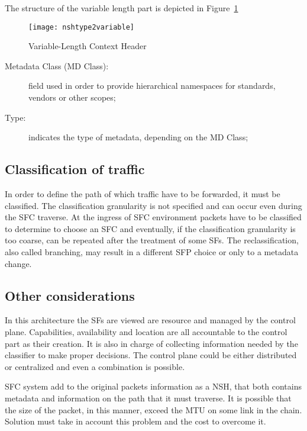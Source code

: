The structure of the variable length part is depicted in
Figure~\ref{chap:background:img:nshtype2variable}

\begin{figure}[H]
  \centering
  \texttt{[image: nshtype2variable]}
  \caption{Variable-Length Context Header~\cite{rfc8300}}
  \label{chap:background:img:nshtype2variable}
\end{figure}

\begin{description}
  \item[Metadata Class (MD Class):] field used in order to provide hierarchical
  namespaces for standards, vendors or other scopes;
  \item[Type:] indicates the type of metadata, depending on the MD Class;
\end{description}


\subsection{Classification of traffic}
In order to define the path of which traffic have to be forwarded, it must be
classified. The classification granularity is not specified and can occur even
during the SFC traverse. At the ingress of SFC environment packets have to be
classified to determine to choose an SFC and eventually, if the classification
granularity is too coarse, can be repeated after the treatment of some SFs. The
reclassification, also called branching, may result in a different SFP choice or
only to a metadata change.

\subsection{Other considerations}
In this architecture the SFs are viewed are resource and managed by the control
plane. Capabilities, availability and location are all accountable to the
control part as their creation. It is also in charge of collecting information
needed by the classifier to make proper decisions. The control plane could be
either distributed or centralized and even a combination is possible. 

SFC system add to the original packets information as a NSH, that both contains
metadata and information on the path that it must traverse. It is possible that
the size of the packet, in this manner, exceed the MTU on some link in the
chain. Solution must take in account this problem and the cost to overcome it.


